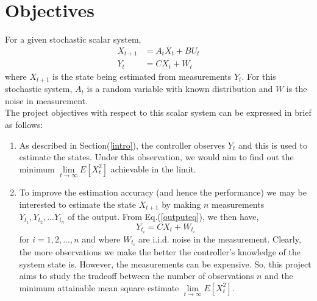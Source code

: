 \documentclass[a4paper,12pt]{article}
\begin{document}
\section{Objectives}
For a given stochastic scalar system,
\begin{align}
X_{t+1} &= A_{t}X_{t} + BU_{t} \\ 
\label{outputeq}
Y_{t} &= CX_{t} + W_{t}
\end{align}
where $X_{t+1}$ is the state being estimated from measurements $Y_{t}$. For this stochastic system, $A_{t}$ is a random variable with known distribution and $W$ is the noise in measurement.\\

The project objectives with respect to this scalar system can be expressed in brief as follows:
\begin{enumerate}
\item As described in Section(\ref{intro}), the controller observes $Y_{t}$ and this is used to estimate the states. Under this observation, we would aim to find out the minimum $\underset{t \to \infty}\lim E[{X_{t}^2}]$ achievable in the limit.
\item To improve the estimation accuracy (and hence the performance) we may be interested to estimate the state $X_{t+1}$ by making $n$ measurements $Y_{t_{1}}, Y_{t_{2}}, ... Y_{t_{n}}$ of the output. From Eq.(\ref{outputeq}), we then have,
\begin{equation}
Y_{t_{i}} = CX_{t} + W_{t_{i}} 
\end{equation}
for $i=1,2,..., n$ and where $W_{t_{i}}$ are i.i.d. noise in the measurement.
Clearly, the more observations we make the better the controller’s knowledge of the system state is. However, the measurements can be expensive. So, this project aims to study the tradeoff between the number of observations $n$ and the minimum attainable mean square estimate $\underset{t \to \infty}\lim E[{X_{t}^{2}}]$.
\end{enumerate}
\end{document}
